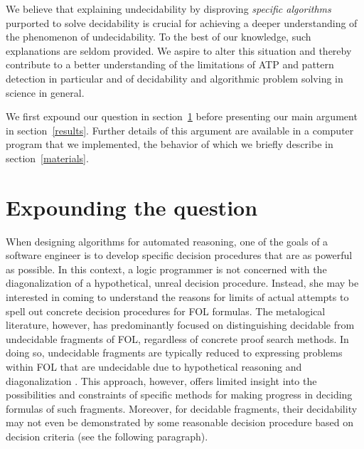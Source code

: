 \documentclass[%
  manuscript=article,   %
  year=2024,
  volume=77,
  doi=00000.000,
]{zfn}
\begin{document}
We believe that explaining undecidability by disproving \emph{specific algorithms} purported to solve decidability is crucial for achieving a deeper understanding of the phenomenon of undecidability. To the best of our knowledge, such explanations are seldom provided. We aspire to alter this situation and thereby contribute to a better understanding of the limitations of ATP and pattern detection in particular and of decidability and algorithmic problem solving in science in general.

We first expound our question in section~\ref{question} before presenting our main argument in section~\ref{results}. Further details of this argument 
are available in a computer program that we implemented, the behavior of which we briefly describe in section~\ref{materials}.

\section{Expounding the question}\label{question}

When designing algorithms for automated reasoning, one of the goals of a software engineer is to develop specific decision procedures that are as powerful as possible. In this context, a logic programmer is not concerned with the diagonalization of a hypothetical, unreal decision procedure. 
Instead, she may be interested in coming to understand the reasons for limits of actual attempts to spell out concrete decision procedures for FOL formulas. 
The metalogical literature, however, has predominantly focused on distinguishing decidable from undecidable fragments of FOL, regardless of concrete proof search methods. In doing so, undecidable fragments are typically reduced to expressing problems within FOL that are undecidable due to hypothetical reasoning and diagonalization \parencite[cf.][]{Boerger_et_al}. This approach, however, offers limited insight into the possibilities and constraints of specific methods for making progress in deciding formulas of such fragments. Moreover, for decidable fragments, their decidability may not even be demonstrated by some reasonable decision procedure based on decision criteria (see the following paragraph).
\end{document}
